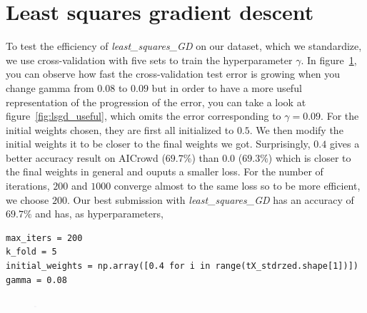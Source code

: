 \documentclass[11pt, a4paper, twoside]{article}
\begin{document}
\section{Least squares gradient descent}
To test the efficiency of \textit{least_squares_GD} on our dataset, which we standardize, we use cross-validation with five sets to train the hyperparameter $\gamma$.
In figure~\ref{fig:lsgd}, you can observe how fast the cross-validation test error is growing when you change gamma from $0.08$ to $0.09$ but in order to have a more useful representation of the progression of the error, you can take a look at figure~\ref{fig:lsgd_useful}, which omits the error corresponding to $\gamma = 0.09$.
For the initial weights chosen, they are first all initialized to $0.5$. We then modify the initial weights it to be closer to the final weights we got. Surprisingly, $0.4$ gives a better accuracy result on AICrowd ($69.7\%$) than $0.0$ ($69.3\%$) which is closer to the final weights in general and ouputs a smaller loss.
For the number of iterations, $200$ and $1000$ converge almost to the same loss so to be more efficient, we choose $200$.
Our best submission with \textit{least_squares_GD} has an accuracy of $69.7\%$ and has, as hyperparameters,
\begin{lstlisting}
max_iters = 200
k_fold = 5
initial_weights = np.array([0.4 for i in range(tX_stdrzed.shape[1])])
gamma = 0.08
\end{lstlisting}

\begin{figure}
    \includegraphics[width= 3, height = 3]{raw_data_least_squares_GD.png}
    \label{fig:lsgd}
\end{figure}
\end{document}
